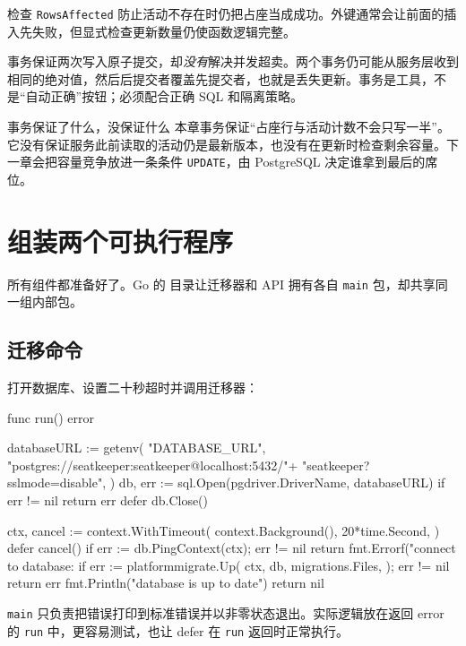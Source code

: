 检查 \texttt{RowsAffected} 防止活动不存在时仍把占座当成成功。外键通常会让前面的插入先失败，但显式检查更新数量仍使函数逻辑完整。

事务保证两次写入原子提交，却\emph{没有}解决并发超卖。两个事务仍可能从服务层收到相同的绝对值，然后后提交者覆盖先提交者，也就是丢失更新。事务是工具，不是“自动正确”按钮；必须配合正确 SQL 和隔离策略。

\begin{infobox}{事务保证了什么，没保证什么}
本章事务保证“占座行与活动计数不会只写一半”。它没有保证服务此前读取的活动仍是最新版本，也没有在更新时检查剩余容量。下一章会把容量竞争放进一条条件 \texttt{UPDATE}，由 PostgreSQL 决定谁拿到最后的席位。
\end{infobox}

\section{组装两个可执行程序}

所有组件都准备好了。Go 的  目录让迁移器和 API 拥有各自 \texttt{main} 包，却共享同一组内部包。

\subsection{迁移命令}

 打开数据库、设置二十秒超时并调用迁移器：

\begin{gocode}[title={代码清单 12.45 \texttt{cmd/migrate/main.go}：运行迁移}]
func run() error {
    databaseURL := getenv(
        "DATABASE_URL",
        "postgres://seatkeeper:seatkeeper@localhost:5432/"+
            "seatkeeper?sslmode=disable",
    )
    db, err := sql.Open(pgdriver.DriverName, databaseURL)
    if err != nil {
        return err
    }
    defer db.Close()

    ctx, cancel := context.WithTimeout(
        context.Background(), 20*time.Second,
    )
    defer cancel()
    if err := db.PingContext(ctx); err != nil {
        return fmt.Errorf("connect to database: %
    }
    if err := platformmigrate.Up(
        ctx, db, migrations.Files,
    ); err != nil {
        return err
    }
    fmt.Println("database is up to date")
    return nil
}
\end{gocode}

\texttt{main} 只负责把错误打印到标准错误并以非零状态退出。实际逻辑放在返回 error 的 \texttt{run} 中，更容易测试，也让 defer 在 \texttt{run} 返回时正常执行。

